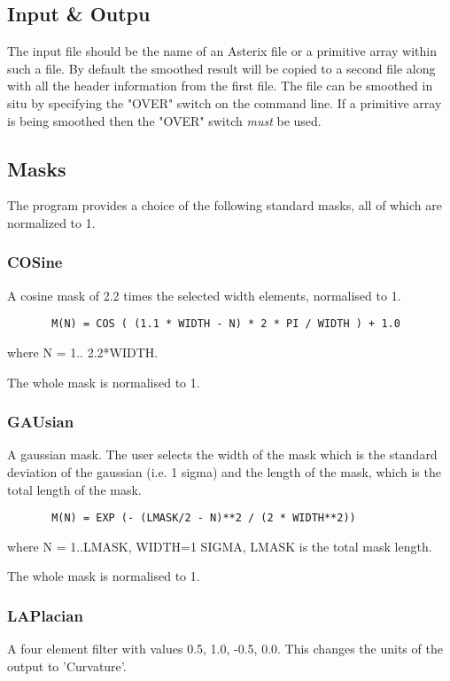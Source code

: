 \documentclass{book}
\renewcommand{\_}{{\tt\char'137}}     %
\begin{document}
\subsection{Input \& Outpu}
The input file should be the name of an Asterix file or a primitive
array within such a file. By default the smoothed
result will be copied to a second file along with all the header
information from the first file. The file can be smoothed in situ by
specifying the "OVER" switch on the command line. If a primitive array
is being smoothed then the "OVER" switch {\em must} be used.

\subsection{Masks}
The program provides a choice of the following standard masks,
all of which are normalized to 1.

\subsubsection{COSine}
A cosine mask of 2.2 times the selected width elements, normalised to 1.
\begin{verbatim}
       M(N) = COS ( (1.1 * WIDTH - N) * 2 * PI / WIDTH ) + 1.0
\end{verbatim}
where N = 1.. 2.2*WIDTH.

The whole mask is normalised to 1.

\subsubsection{GAUsian}
A gaussian mask. The user selects the width of the mask which
is the standard deviation of the gaussian (i.e. 1 sigma) and the
length of the mask, which is the total length of the mask.

\begin{verbatim}
       M(N) = EXP (- (LMASK/2 - N)**2 / (2 * WIDTH**2))
\end{verbatim}
where N = 1..LMASK, WIDTH=1 SIGMA, LMASK is the total mask length.

The whole mask is normalised to 1.

\subsubsection{LAPlacian}
A four element filter with values 0.5, 1.0, -0.5, 0.0. This
changes the units of the output to 'Curvature'.
\end{document}
